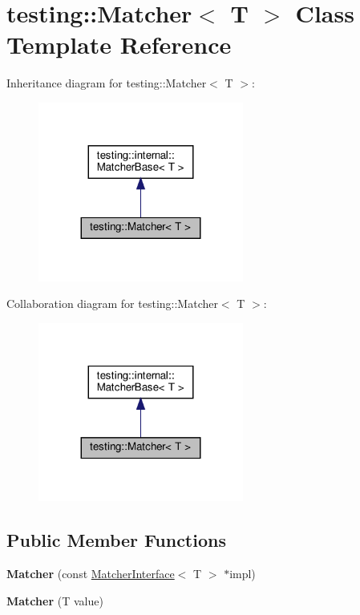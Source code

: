 \hypertarget{classtesting_1_1_matcher}{}\section{testing\+:\+:Matcher$<$ T $>$ Class Template Reference}
\label{classtesting_1_1_matcher}


Inheritance diagram for testing\+:\+:Matcher$<$ T $>$\+:
\nopagebreak
\begin{figure}[H]
\begin{center}
\leavevmode
\includegraphics[width=191pt]{classtesting_1_1_matcher__inherit__graph}
\end{center}
\end{figure}


Collaboration diagram for testing\+:\+:Matcher$<$ T $>$\+:
\nopagebreak
\begin{figure}[H]
\begin{center}
\leavevmode
\includegraphics[width=191pt]{classtesting_1_1_matcher__coll__graph}
\end{center}
\end{figure}
\subsection*{Public Member Functions}
\begin{DoxyCompactItemize}
\item 
\mbox{\label{classtesting_1_1_matcher_aea32eb3f86233853de91929fb2691bf3}} 
{\bfseries Matcher} (const \hyperlink{classtesting_1_1_matcher_interface}{Matcher\+Interface}$<$ T $>$ $\ast$impl)
\item 
\mbox{\label{classtesting_1_1_matcher_adc75e0bd47ffc75ba8a5f760372d0493}} 
{\bfseries Matcher} (T value)
\end{DoxyCompactItemize}
